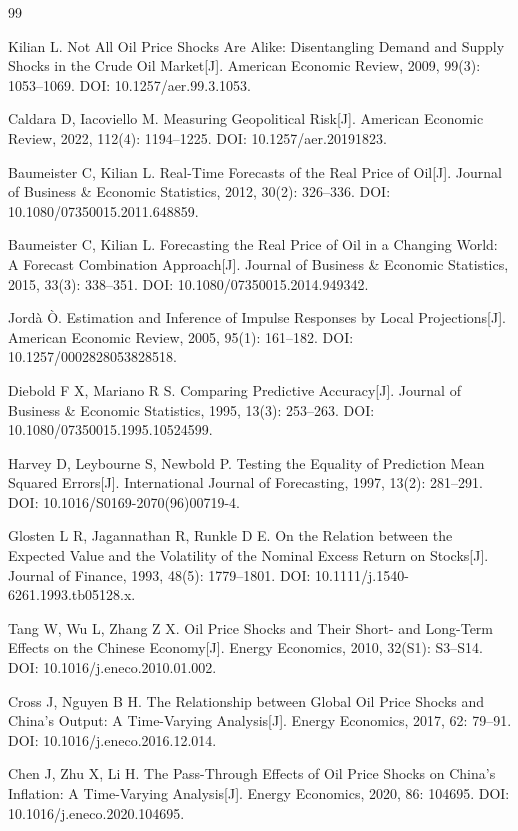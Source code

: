 \begin{thebibliography}{99}

Kilian L. Not All Oil Price Shocks Are Alike: Disentangling Demand and Supply
Shocks in the Crude Oil Market[J]. American Economic Review, 2009, 99(3):
1053--1069. DOI: 10.1257/aer.99.3.1053.

Caldara D, Iacoviello M. Measuring Geopolitical Risk[J]. American Economic
Review, 2022, 112(4): 1194--1225. DOI: 10.1257/aer.20191823.

Baumeister C, Kilian L. Real-Time Forecasts of the Real Price of Oil[J].
Journal of Business \& Economic Statistics, 2012, 30(2): 326--336.
DOI: 10.1080/07350015.2011.648859.

Baumeister C, Kilian L. Forecasting the Real Price of Oil in a Changing World:
A Forecast Combination Approach[J]. Journal of Business \& Economic Statistics,
2015, 33(3): 338--351. DOI: 10.1080/07350015.2014.949342.

Jord\`a \`O. Estimation and Inference of Impulse Responses by Local
Projections[J]. American Economic Review, 2005, 95(1): 161--182.
DOI: 10.1257/0002828053828518.

Diebold F X, Mariano R S. Comparing Predictive Accuracy[J]. Journal of
Business \& Economic Statistics, 1995, 13(3): 253--263.
DOI: 10.1080/07350015.1995.10524599.

Harvey D, Leybourne S, Newbold P. Testing the Equality of Prediction Mean
Squared Errors[J]. International Journal of Forecasting, 1997, 13(2):
281--291. DOI: 10.1016/S0169-2070(96)00719-4.

Glosten L R, Jagannathan R, Runkle D E. On the Relation between the Expected
Value and the Volatility of the Nominal Excess Return on Stocks[J]. Journal of
Finance, 1993, 48(5): 1779--1801.
DOI: 10.1111/j.1540-6261.1993.tb05128.x.

Tang W, Wu L, Zhang Z X. Oil Price Shocks and Their Short- and Long-Term
Effects on the Chinese Economy[J]. Energy Economics, 2010, 32(S1): S3--S14.
DOI: 10.1016/j.eneco.2010.01.002.

Cross J, Nguyen B H. The Relationship between Global Oil Price Shocks and
China's Output: A Time-Varying Analysis[J]. Energy Economics, 2017, 62:
79--91. DOI: 10.1016/j.eneco.2016.12.014.

Chen J, Zhu X, Li H. The Pass-Through Effects of Oil Price Shocks on China's
Inflation: A Time-Varying Analysis[J]. Energy Economics, 2020, 86: 104695.
DOI: 10.1016/j.eneco.2020.104695.


\end{thebibliography}

